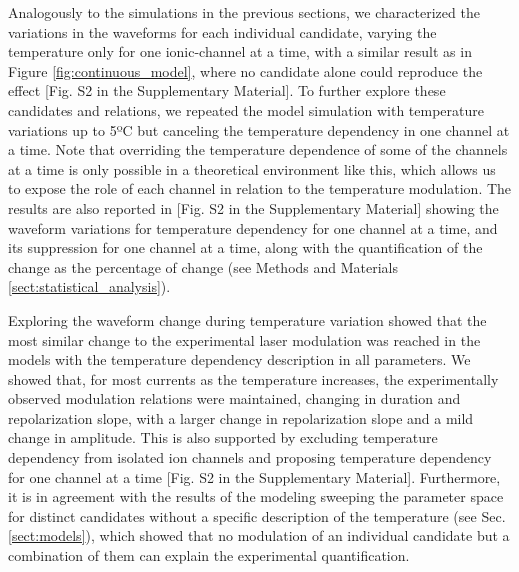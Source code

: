 Analogously to the simulations in the previous sections, we characterized the variations in the waveforms for each individual candidate, varying the temperature only for one ionic-channel at a time, with a similar result as in Figure \ref{fig:continuous_model}, where no candidate alone could reproduce the effect [Fig. S2 in the Supplementary Material]. To further explore these candidates and relations, we repeated the model simulation with temperature variations up to 5ºC but canceling the temperature dependency in one channel at a time. Note that overriding the temperature dependence of some of the channels at a time is only possible in a theoretical environment like this, which allows us to expose the role of each channel in relation to the temperature modulation. The results are also reported in [Fig. S2 in the Supplementary Material] showing the waveform variations for temperature dependency for one channel at a time, and its suppression for one channel at a time, along with the quantification of the change as the percentage of change (see Methods and Materials \ref{sect:statistical_analysis}). 

Exploring the waveform change during temperature variation showed that the most similar change to the experimental laser modulation was reached in the models with the temperature dependency description in all parameters. We showed that, for most currents as the temperature increases, the experimentally observed modulation relations were maintained, changing in duration and repolarization slope, with a larger change in repolarization slope and a mild change in amplitude. This is also supported by excluding temperature dependency from isolated ion channels and proposing temperature dependency for one channel at a time [Fig. S2 in the Supplementary Material]. Furthermore, it is in agreement with the results of the modeling sweeping the parameter space for distinct candidates without a specific description of the temperature (see Sec. \ref{sect:models}), which showed that no modulation of an individual candidate but a combination of them can explain the experimental quantification.


